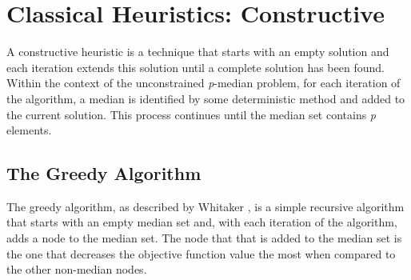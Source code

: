 \documentclass[11pt]{article}
\begin{document}
	\section{Classical Heuristics: Constructive} \label{classicheuristics.constructive}
	A constructive heuristic is a technique that starts with an empty solution and each iteration extends this solution until a complete solution has been found.  Within the context of the unconstrained \emph{p}-median problem, for each iteration of the algorithm, a median is identified by some deterministic method and added to the current solution.  This process continues until the median set contains \emph{p} elements.
	
	\subsection{The Greedy Algorithm}\label{greedyalgo}
	The greedy algorithm, as described by Whitaker \cite{WHIT83},  is a simple recursive algorithm that starts with an empty median set and, with each iteration of the algorithm, adds a node to the median set.  The node that that is added to the median set is the one that decreases the objective function value the most when compared to the other non-median nodes.
	
\end{document}
